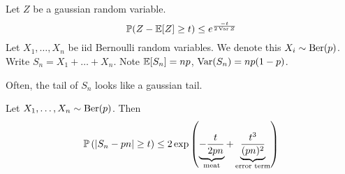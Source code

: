 \documentclass{article}
\begin{document}
Let $Z$ be a gaussian random variable.
$$\mathbb P(Z - \mathbb E[Z] \ge t) \le e^{\frac{-t}{2\operatorname{Var} Z}}$$
Let $X_1, \dots, X_n$ be iid Bernoulli random variables. We denote this $X_i \sim \operatorname{Ber}(p)$. Write $S_n = X_1 + \dots + X_n$. Note $\mathbb E[S_n] = np$, $\operatorname{Var}(S_n)=np(1 - p)$.

\begin{idea}
  Often, the tail of $S_n$ looks like a gaussian tail.
\end{idea}

\begin{thm}
  Let $X_1, \dots, X_n \sim \operatorname{Ber}(p)$. Then
  $$\mathbb P\left(\left\lvert S_n - pn\right\rvert \ge t\right) \le 2\exp\left(\underbrace{-\frac t{2pn}}_{\text{meat}} + \underbrace{\frac{t^3}{(pn)^2}}_{\text{error term}}\right)$$
\end{thm}

\newlec

\printindex
\end{document}
